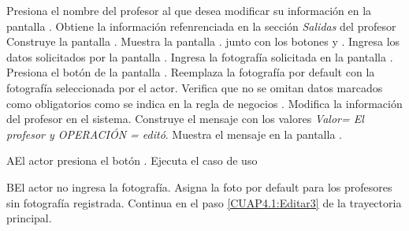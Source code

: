	\begin{UCtrayectoria}
		\UCpaso[\UCactor] Presiona el nombre del profesor al que desea modificar su información en la pantalla .
			\UCpaso[\UCsist] Obtiene la información refenrenciada en la sección \textit{Salidas} del profesor
		\UCpaso[\UCsist] Construye la pantalla .
		\UCpaso[\UCsist] Muestra la pantalla . junto con los botones  y . 
		\UCpaso[\UCactor] Ingresa los datos solicitados por la pantalla .\label{CUAP4.1:Editar} 
		\UCpaso[\UCactor] Ingresa la fotografía solicitada en la pantalla .
		\UCpaso Presiona el botón  de la pantalla .\label{CUAP4.1:Editar3} 
		\UCpaso[\UCsist] Reemplaza la fotografía por default con la fotografía seleccionada por el actor.
		\UCpaso[\UCsist] Verifica que no se omitan datos marcados como obligatorios como se indica en la regla de negocios . 
		\UCpaso[\UCsist] Modifica la información del profesor en el sistema. \label{CUAP4.1:Editar2}
		\UCpaso[\UCsist] Construye el mensaje  con los valores \textit{Valor= El profesor y OPERACIÓN = editó}.
		\UCpaso[\UCsist] Muestra el mensaje   en la pantalla .
		
				
%		
		
	\end{UCtrayectoria}
	
	\begin{UCtrayectoriaA}{A}{El actor presiona el botón .}
		\UCpaso[\UCsist] Ejecuta el caso de uso 
	\end{UCtrayectoriaA}
	
		\begin{UCtrayectoriaA}{B}{El actor no ingresa la fotografía.}
		\UCpaso[\UCsist] Asigna la foto por default para los profesores sin fotografía registrada.
		\UCpaso[] Continua en el paso \ref{CUAP4.1:Editar3} de la trayectoria principal.
	\end{UCtrayectoriaA}
	

